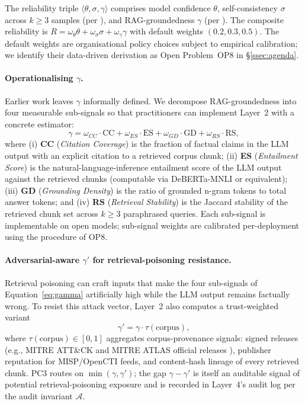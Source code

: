 \documentclass[preprint,12pt,authoryear]{elsarticle}
\begin{document}
The reliability triple $\langle \theta, \sigma, \gamma\rangle$ comprises model confidence $\theta$, self-consistency $\sigma$ across $k \geq 3$ samples (per \citet{manakul2023selfcheckgpt}), and RAG-groundedness $\gamma$ (per \citet{techniquerag2025,fayyazi2024llm,cyberrag2025}). The composite reliability is $R = \omega_\theta\theta + \omega_\sigma\sigma + \omega_\gamma\gamma$ with default weights $(0.2, 0.3, 0.5)$. The default weights are organisational policy choices subject to empirical calibration; we identify their data-driven derivation as Open Problem~OP8 in §\ref{ssec:agenda}.

\paragraph{Operationalising $\gamma$.}
Earlier work leaves $\gamma$ informally defined. We decompose RAG-groundedness into four measurable sub-signals so that practitioners can implement Layer~2 with a concrete estimator:
\begin{equation}
\gamma = \omega_{CC} \cdot \text{CC} + \omega_{ES} \cdot \text{ES} + \omega_{GD} \cdot \text{GD} + \omega_{RS} \cdot \text{RS},
\label{eq:gamma}
\end{equation}
where (i) \textbf{CC} (\emph{Citation Coverage}) is the fraction of factual claims in the LLM output with an explicit citation to a retrieved corpus chunk; (ii) \textbf{ES} (\emph{Entailment Score}) is the natural-language-inference entailment score of the LLM output against the retrieved chunks (computable via DeBERTa-MNLI or equivalent); (iii) \textbf{GD} (\emph{Grounding Density}) is the ratio of grounded n-gram tokens to total answer tokens; and (iv) \textbf{RS} (\emph{Retrieval Stability}) is the Jaccard stability of the retrieved chunk set across $k \geq 3$ paraphrased queries. Each sub-signal is implementable on open models; sub-signal weights are calibrated per-deployment using the procedure of OP8.

\paragraph{Adversarial-aware $\gamma'$ for retrieval-poisoning resistance.}
Retrieval poisoning \citep{greshake2023indirect,liu2024formalizing} can craft inputs that make the four sub-signals of Equation~\eqref{eq:gamma} artificially high while the LLM output remains factually wrong. To resist this attack vector, Layer~2 also computes a trust-weighted variant
\begin{equation}
\gamma' = \gamma \cdot \tau(\text{corpus}),
\label{eq:gammaprime}
\end{equation}
where $\tau(\text{corpus}) \in [0,1]$ aggregates corpus-provenance signals: signed releases (e.g., MITRE ATT\&CK and MITRE ATLAS official releases \citep{mitre2024attck,mitre2025atlas}), publisher reputation for MISP/OpenCTI feeds, and content-hash lineage of every retrieved chunk. PC3 routes on $\min(\gamma, \gamma')$; the gap $\gamma - \gamma'$ is itself an auditable signal of potential retrieval-poisoning exposure and is recorded in Layer~4's audit log per the audit invariant $\mathcal{A}$.
\end{document}

